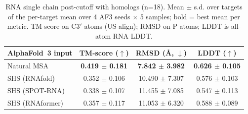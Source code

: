 \begin{table}[htbp]
\centering
\caption{RNA single chain post-cutoff with homologs (n=18). Mean $\pm$ s.d. over targets of the per-target mean over 4 AF3 seeds $\times$ 5 samples; bold = best mean per metric. TM-score on C3$'$ atoms (US-align); RMSD on P atoms; LDDT is all-atom RNA LDDT.}
\label{tab:rna_single_chain_post_cutoff_with_homologs}
\begin{tabular}{lccc}
\toprule
AlphaFold~3 input & TM-score ($\uparrow$) & RMSD (\AA, $\downarrow$) & LDDT ($\uparrow$) \\
\midrule
Natural MSA & \textbf{0.419 $\pm$ 0.181} & \textbf{7.842 $\pm$ 3.982} & \textbf{0.626 $\pm$ 0.105} \\
SHS (RNAfold) & 0.352 $\pm$ 0.106 & 10.490 $\pm$ 7.307 & 0.576 $\pm$ 0.103 \\
SHS (SPOT-RNA) & 0.338 $\pm$ 0.107 & 11.455 $\pm$ 7.085 & 0.547 $\pm$ 0.113 \\
SHS (RNAformer) & 0.357 $\pm$ 0.117 & 11.053 $\pm$ 6.320 & 0.588 $\pm$ 0.089 \\
\bottomrule
\end{tabular}
\end{table}
